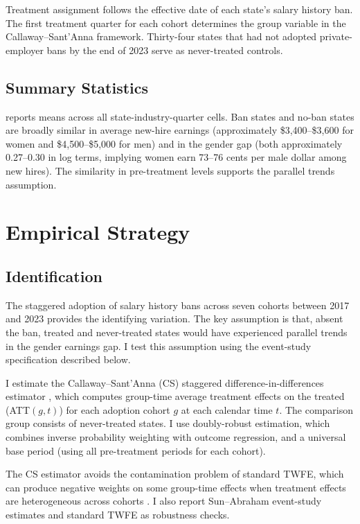 \documentclass[12pt]{article}
\begin{document}
Treatment assignment follows the effective date of each state's salary history ban. The first treatment quarter for each cohort determines the group variable in the Callaway--Sant'Anna framework. Thirty-four states that had not adopted private-employer bans by the end of 2023 serve as never-treated controls.

\subsection{Summary Statistics}



 reports means across all state-industry-quarter cells. Ban states and no-ban states are broadly similar in average new-hire earnings (approximately \$3,400--\$3,600 for women and \$4,500--\$5,000 for men) and in the gender gap (both approximately 0.27--0.30 in log terms, implying women earn 73--76 cents per male dollar among new hires). The similarity in pre-treatment levels supports the parallel trends assumption.


\section{Empirical Strategy}

\subsection{Identification}

The staggered adoption of salary history bans across seven cohorts between 2017 and 2023 provides the identifying variation. The key assumption is that, absent the ban, treated and never-treated states would have experienced parallel trends in the gender earnings gap. I test this assumption using the event-study specification described below.

I estimate the Callaway--Sant'Anna (CS) staggered difference-in-differences estimator \citep{CallawaySantanna2021}, which computes group-time average treatment effects on the treated (ATT$(g,t)$) for each adoption cohort $g$ at each calendar time $t$. The comparison group consists of never-treated states. I use doubly-robust estimation, which combines inverse probability weighting with outcome regression, and a universal base period (using all pre-treatment periods for each cohort).

The CS estimator avoids the contamination problem of standard TWFE, which can produce negative weights on some group-time effects when treatment effects are heterogeneous across cohorts \citep{GoodmanBacon2021}. I also report Sun--Abraham event-study estimates \citep{SunAbraham2021} and standard TWFE as robustness checks.
\end{document}
